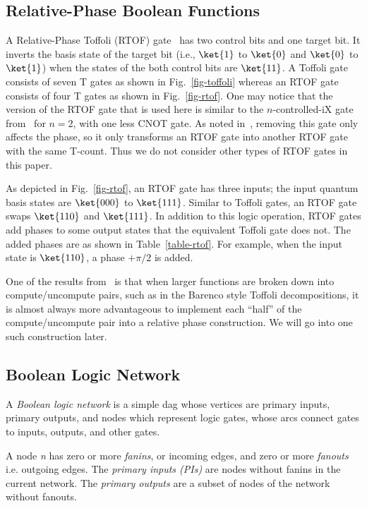 \subsection{Relative-Phase Boolean Functions}

A Relative-Phase Toffoli (RTOF) gate~\cite{bib-rtof-maslov} has two
control bits and one target bit. It inverts the basis state of the
target bit (i.e., $\ket{1}$ to $\ket{0}$ and $\ket{0}$ to $\ket{1}$)
when the states of the both control bits are $\ket{11}$. A Toffoli
gate consists of seven T gates as shown in Fig.~\ref{fig-toffoli}
whereas an RTOF gate consists of four T gates as shown in
Fig.~\ref{fig-rtof}. One may notice that the version of the RTOF gate
that is used here is similar to the $n$-controlled-iX gate
from~\cite{bib-selinger-rtof} for $n=2$, with one less CNOT gate. As
noted in~\cite{bib-rtof-maslov}, removing this gate only affects the
phase, so it only transforms an RTOF gate into another RTOF gate with
the same T-count. Thus we do not consider other types of RTOF gates in 
this paper. 

As depicted in Fig.~\ref{fig-rtof}, an RTOF gate has three inputs; the input quantum basis states are $\ket{000}$ to $\ket{111}$. Similar to Toffoli gates, an RTOF gate swaps  $\ket{110}$ and $\ket{111}$. In addition to this logic operation, RTOF gates add phases to some output states that the equivalent Toffoli gate does not. The added phases are as shown in Table~\ref{table-rtof}. For example, when the input state is $\ket{110}$, a phase $+\pi/2$ is added.

One of the results from~\cite{bib-rtof-maslov} is that when larger functions are broken down into compute/uncompute pairs, such as in the Barenco style Toffoli decompositions, it is almost always more advantageous to implement each ``half'' of the compute/uncompute pair into a relative phase construction. We will go into one such construction later.
\vspace{-0.25cm}
\subsection{Boolean Logic Network}

A {\it Boolean logic network} is a simple dag whose vertices are primary inputs, primary outputs, and nodes which represent logic gates, whose arcs connect gates to inputs, outputs, and other gates.

A node {\it n} has zero or more {\it fanins}, or incoming edges, and zero or more {\it fanouts} i.e. outgoing edges. The {\it primary inputs (PIs)} are nodes without fanins in the current network. The {\it primary outputs} are a subset of nodes of the network without fanouts. 

